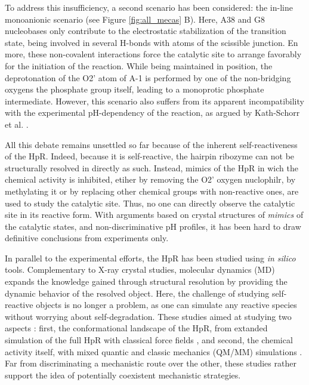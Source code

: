\documentclass[journal=jacsat,manuscript=article]{achemso}
\begin{document}
To address this insufficiency, a second scenario has been considered: the in-line monoanionic scenario (see Figure \ref{fig:all_mecas} B). 
Here, A38 and G8 nucleobases only contribute to the electrostatic stabilization of the transition state, 
being involved in several H-bonds with atoms of the scissible junction. 
En more, these non-covalent interactions force the catalytic site to arrange favorably for the initiation of the reaction.
While being maintained in position, 
the deprotonation of the O2' atom of A-1 is performed by one of the non-bridging oxygens the phosphate group itself, 
leading to a monoprotic phosphate intermediate. 
However, this scenario also suffers from its apparent incompatibility with the experimental pH-dependency of the reaction, 
as argued by Kath-Schorr et al. \cite{kath-schorr_general_2012}.

All this debate remains unsettled so far because of the inherent self-reactiveness of the HpR. 
Indeed, because it is self-reactive, the hairpin ribozyme can not be structurally resolved in directly as such.
Instead, mimics of the HpR in wich the chemical activity is inhibited, etiher by removing the O2' oxygen nuclophilr, by methylating it
or by replacing other chemical groups with non-reactive ones, are used to study the catalytic site.
Thus, no one can directly observe the catalytic site in its reactive form.
With arguments based on crystal structures of \textit{mimics} of the catalytic states,
and non-discriminative pH profiles, it has been hard to draw definitive conclusions from experiments only.

In parallel to the experimental efforts, the HpR has been studied using \textit{in silico} tools.
Complementary to X-ray crystal studies, molecular dynamics (MD) expands the knowledge gained through structural resolution
by providing the dynamic behavior of the resolved object. 
Here, the challenge of studying self-reactive objects is no longer a problem,
as one can simulate any reactive species without worrying about self-degradation.
These studies aimed at studying two aspects : first, the conformational landscape of the HpR, from extanded simulation of the full HpR with classical force fields \cite{mlynsky_extensive_2010, mlynsky_reactive_2015,kumar_mechanistic_2018},
and second, the chemical activity itself, with mixed quantic and classic mechanics (QM/MM) simulations \cite{mlynsky_qmmm_2011, mlynsky_comparison_2014, mlynsky_qmmm_2011, nam_electrostatic_2008, nam_electrostatic_2009,kumar_deciphering_2020}.
Far from discriminating a mechanistic route over the other, these studies rather support the idea of potentially coexistent mechanistic strategies.
\end{document}
